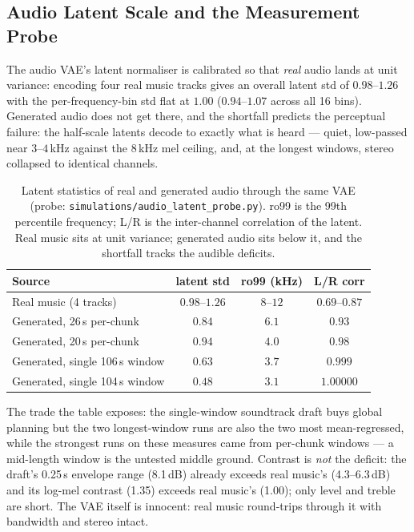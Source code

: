 \documentclass[12pt]{article}
\begin{document}
\subsection{Audio Latent Scale and the Measurement Probe}
\label{sec:exp_scale}

The audio VAE's latent normaliser is calibrated so that \emph{real} audio
lands at unit variance: encoding four real music tracks gives an overall
latent std of $0.98$--$1.26$ with the per-frequency-bin std flat at $1.00$
($0.94$--$1.07$ across all 16 bins).  Generated audio does not get there, and
the shortfall predicts the perceptual failure: the half-scale latents decode
to exactly what is heard --- quiet, low-passed near $3$--$4$\,kHz against the
$8$\,kHz mel ceiling, and, at the longest windows, stereo collapsed to
identical channels.

\begin{table}[H]
\centering
\caption{Latent statistics of real and generated audio through the same VAE
(probe: \texttt{simulations/audio\_latent\_probe.py}).  ro99 is the 99th
percentile frequency; L/R is the inter-channel correlation of the latent.
Real music sits at unit variance; generated audio sits below it, and the
shortfall tracks the audible deficits.}
\label{tab:scale}
\begin{tabular}{lccc}
\toprule
Source & latent std & ro99 (kHz) & L/R corr \\
\midrule
Real music (4 tracks) & $0.98$--$1.26$ & $8$--$12$ & $0.69$--$0.87$ \\
Generated, 26\,s per-chunk & $0.84$ & $6.1$ & $0.93$ \\
Generated, 20\,s per-chunk & $0.94$ & $4.0$ & $0.98$ \\
Generated, single 106\,s window & $0.63$ & $3.7$ & $0.999$ \\
Generated, single 104\,s window & $0.48$ & $3.1$ & $1.00000$ \\
\bottomrule
\end{tabular}
\end{table}

The trade the table exposes: the single-window soundtrack draft buys global
planning but the two longest-window runs are also the two most
mean-regressed, while the strongest runs on these measures came from
per-chunk windows --- a mid-length window is the untested middle ground.
Contrast is \emph{not} the deficit: the draft's 0.25\,s envelope range
(8.1\,dB) already exceeds real music's (4.3--6.3\,dB) and its log-mel
contrast (1.35) exceeds real music's (1.00); only level and treble are
short.  The VAE itself is innocent: real music round-trips through it with
bandwidth and stereo intact.
\end{document}
